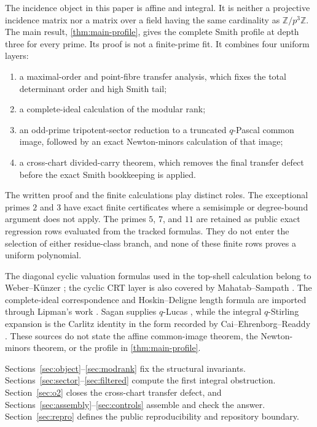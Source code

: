 \documentclass[12pt,a4paper]{article}
\theoremstyle{definition}
\newcommand{\Z}{\mathbb Z}
\begin{document}
The incidence object in this paper is affine and integral.  It is neither a
projective incidence matrix nor a matrix over a field having the same
cardinality as $\Z/p^3\Z$.  The main result, \cref{thm:main-profile}, gives
the complete Smith profile at depth three for every prime.  Its proof is
not a finite-prime fit.  It combines four uniform layers:

\begin{enumerate}
\item a maximal-order and point-fibre transfer analysis, which fixes the
  total determinant order and high Smith tail;
\item a complete-ideal calculation of the modular rank;
\item an odd-prime tripotent-sector reduction to a truncated $q$-Pascal
  common image, followed by an exact Newton-minors calculation of that
  image;
\item a cross-chart divided-carry theorem, which removes the final transfer
  defect before the exact Smith bookkeeping is applied.
\end{enumerate}

The written proof and the finite calculations play distinct roles.
The exceptional primes $2$ and $3$ have exact finite certificates where a
semisimple or degree-bound argument does not apply.  The primes $5$, $7$,
and $11$ are retained as public exact regression rows evaluated from the
tracked formulas.  They do not enter the selection of either residue-class
branch, and none of these finite rows proves a uniform polynomial.

The diagonal cyclic valuation formulas used in the top-shell calculation
belong to Weber--K\"unzer \cite{WK04}; the cyclic CRT layer is also covered
by Mahatab--Sampath \cite{MS15}.  The complete-ideal correspondence and
Hoskin--Deligne length formula are imported through Lipman's work
\cite{LIP93,LW03}.  Sagan supplies $q$-Lucas \cite{SAG92}, while the
integral $q$-Stirling expansion is the Carlitz identity in the form recorded
by Cai--Ehrenborg--Readdy \cite{CER18}.  These sources do not state the
affine common-image theorem, the Newton-minors theorem, or the profile in
\cref{thm:main-profile}.

Sections~\ref{sec:object}--\ref{sec:modrank} fix the structural invariants.
Sections~\ref{sec:sector}--\ref{sec:filtered} compute the first integral
obstruction.  Section~\ref{sec:o2} closes the cross-chart transfer defect,
  and Sections~\ref{sec:assembly}--\ref{sec:controls} assemble and check the
answer.  Section~\ref{sec:repro} defines the public reproducibility and
repository boundary.
\end{document}
